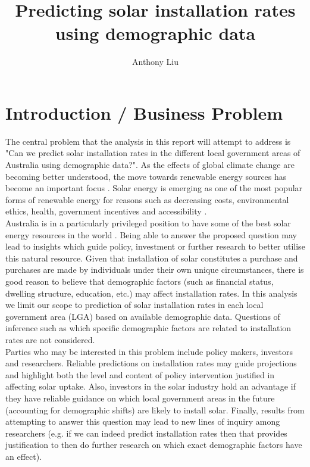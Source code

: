 \documentclass{article}
\begin{document}
\author{Anthony Liu}
\title{Predicting solar installation rates using demographic data}
\maketitle

\section{Introduction / Business Problem}

The central problem that the analysis in this report will attempt to address is "Can we predict solar installation rates in the different local government areas of Australia using demographic data?". As the effects of global climate change are becoming better understood, the move towards renewable energy sources has become an important focus \cite{ipcc}. Solar energy is emerging as one of the most popular forms of renewable energy for reasons such as decreasing costs, environmental ethics, health, government incentives and accessibility \cite{pew, seia}. \\

Australia is in a particularly privileged position to have some of the best solar energy resources in the world \cite{geogov}. Being able to answer the proposed question may lead to insights which guide policy, investment or further research to better utilise this natural resource. Given that installation of solar constitutes a purchase and purchases are made by individuals under their own unique circumstances, there is good reason to believe that demographic factors (such as financial status, dwelling structure, education, etc.) may affect installation rates. In this analysis we limit our scope to prediction of solar installation rates in each local government area (LGA) based on available demographic data. Questions of inference such as which specific demographic factors are related to installation rates are not considered. \\

Parties who may be interested in this problem include policy makers, investors and researchers. Reliable predictions on installation rates may guide projections and highlight both the level and content of policy intervention justified in affecting solar uptake. Also, investors in the solar industry hold an advantage if they have reliable guidance on which local government areas in the future (accounting for demographic shifts) are likely to install solar. Finally, results from attempting to answer this question may lead to new lines of inquiry among researchers (e.g. if we can indeed predict installation rates then that provides justification to then do further research on which exact demographic factors have an effect).
\end{document}
